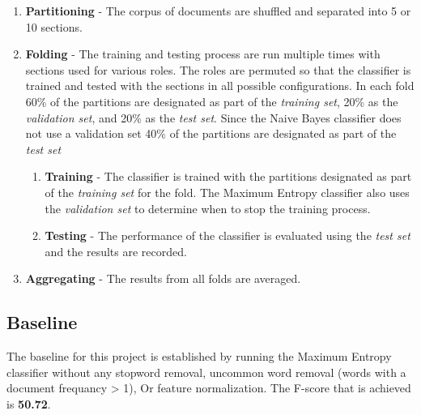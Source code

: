 \documentclass[final,3p,12pt]{elsarticle}
\begin{document}
        \begin{enumerate}

        \item \textbf{Partitioning} - The corpus of documents are shuffled and
            separated into 5 or 10 sections.

        \item \textbf{Folding} - The training and testing process are run
            multiple times with sections used for various roles. The roles are
            permuted so that the classifier is trained and tested with the
            sections in all possible configurations. In each fold 60\% of the
            partitions are designated as part of the \textit{training set},
            20\% as the \textit{validation set}, and 20\% as the \textit{test set}.
            Since the Naive Bayes classifier does not use a validation set
            40\% of the partitions are designated as part of the \textit{test set}


        \begin{enumerate}

            \item \textbf{Training} - The classifier is trained with the
                partitions designated as part of the \textit{training set} for
                the fold. The Maximum Entropy classifier also uses the
                \textit{validation set} to determine when to stop the training
                process.

            \item \textbf{Testing} - The performance of the classifier is
                evaluated using the \textit{test set} and the results are recorded.

        \end{enumerate}

        \item \textbf{Aggregating} - The results from all folds are averaged.

        \end{enumerate}


\subsection{Baseline}
\label{ssection:baseline}

The baseline for this project is established by running the Maximum Entropy
classifier without any stopword removal, uncommon word removal (words with a
document frequancy > 1), Or feature normalization. The F-score that is achieved
is \textbf{50.72}.
\end{document}
